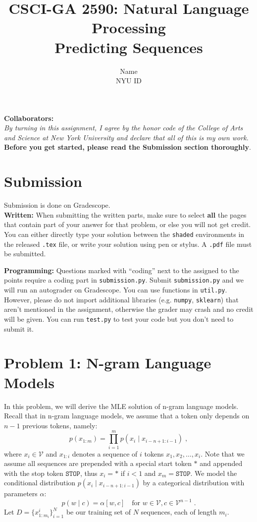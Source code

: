 \documentclass{article}
\title{\textbf{CSCI-GA 2590: Natural Language Processing} \\Predicting Sequences}
\author{Name \\
NYU ID}
\date{}
\theoremstyle{case}
\theoremstyle{definition}
\begin{document}
\maketitle

\textbf{Collaborators:} \\
\textit{By turning in this assignment, I agree by the honor code of the College of Arts and Science at New York University and declare
that all of this is my own work.} \\

\textbf{Before you get started, please read the Submission section thoroughly}.

\section*{Submission}
Submission is done on Gradescope. \\

\textbf{Written:} When submitting the written parts, make sure to select \textbf{all} the pages that contain part of your answer for that problem, or else you will not get credit.
You can either directly type your solution between the \texttt{shaded} environments in the released \texttt{.tex} file,
or write your solution using pen or stylus. 
A \texttt{.pdf} file must be submitted.

\textbf{Programming:} Questions marked with ``coding'' next to the assigned to the points require a coding part in \texttt{submission.py}.
Submit \texttt{submission.py} and we will run an autograder on Gradescope. You can use functions in \texttt{util.py}. However, please do not import additional libraries (e.g. \texttt{numpy}, \texttt{sklearn}) that aren't mentioned in the assignment, otherwise the grader may crash and no credit will be given.
You can run \texttt{test.py} to test your code but you don't need to submit it.


\section*{Problem 1: N-gram Language Models}
In this problem, we will derive the MLE solution of n-gram language models. 
Recall that in n-gram language models, we assume that a token only depends on $n-1$ previous tokens, namely:
$$
p(x_{1:m}) = \prod_{i=1}^m p(x_i\mid x_{i-n+1:i-1}) \;,
$$
where $x_i\in\mathcal{V}$
and $x_{1:i}$ denotes a sequence of $i$ tokens $x_1, x_2, \ldots, x_i$.
Note that we assume all sequences are prepended with a special start token $\ast$
and appended with the stop token $\texttt{STOP}$,
thus $x_i=\ast$ if $i<1$ and $x_m = \texttt{STOP}$.
We model the conditional distribution $p(x_i\mid x_{i-n+1:i-1})$
by a categorical distribution with parameters $\alpha$:
$$
p(w\mid c) = \alpha[w,c] \quad \text{for } w\in\mathcal{V}, c\in\mathcal{V}^{n-1} 
\;.
$$
Let $D=\{x^{i}_{1:m_i}\}_{i=1}^N$ be our training set of $N$ sequences, each of length $m_i$.
\end{document}
